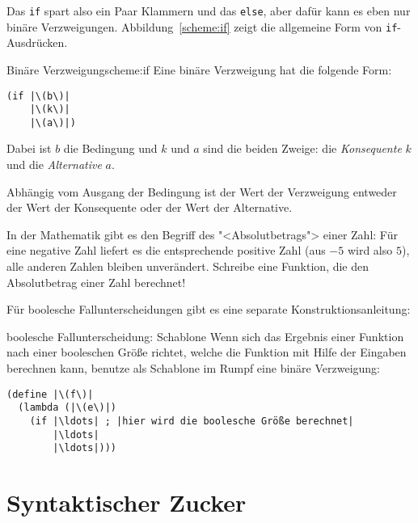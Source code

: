 %
Das \lstinline{if} spart also ein Paar Klammern und das \lstinline{else},
aber dafür kann es eben nur binäre Verzweigungen.
Abbildung~\ref{scheme:if} zeigt die allgemeine Form von
\lstinline{if}-Ausdrücken.
\begin{feature}{Binäre Verzweigung}{scheme:if}
  Eine binäre Verzweigung hat die folgende Form:
\begin{lstlisting}
(if |\(b\)|
    |\(k\)|
    |\(a\)|)
\end{lstlisting}
Dabei ist $b$ die Bedingung und $k$ und $a$ sind die
beiden Zweige: die \textit{Konsequente} $k$ und die
\textit{Alternative} $a$.

Abhängig vom Ausgang der
Bedingung ist der Wert der Verzweigung entweder der Wert der Konsequente
oder der Wert der Alternative.
\end{feature}
%
\begin{aufgabeinline}
  In der Mathematik gibt es den Begriff des "<Absolutbetrags"> einer
  Zahl: Für eine negative Zahl liefert es die entsprechende positive
  Zahl (aus $-5$ wird also $5$), alle anderen Zahlen bleiben
  unverändert.  Schreibe eine Funktion, die den Absolutbetrag einer
  Zahl berechnet!
\end{aufgabeinline}
%
Für boolesche Fallunterscheidungen gibt es eine separate
Konstruktionsanleitung:
%
\begin{konstruktionsanleitung}{boolesche Fallunterscheidung: Schablone}
  \label{ka:boolesche-fallunterscheidung}
  Wenn sich das Ergebnis einer Funktion nach einer booleschen Größe
  richtet, welche die Funktion mit Hilfe der Eingaben berechnen kann,
  benutze als Schablone im Rumpf eine binäre Verzweigung:
\begin{lstlisting}
(define |\(f\)|
  (lambda (|\(e\)|)
    (if |\ldots| ; |hier wird die boolesche Größe berechnet|
        |\ldots|
        |\ldots|)))
\end{lstlisting}
\end{konstruktionsanleitung}

\section{Syntaktischer Zucker}

